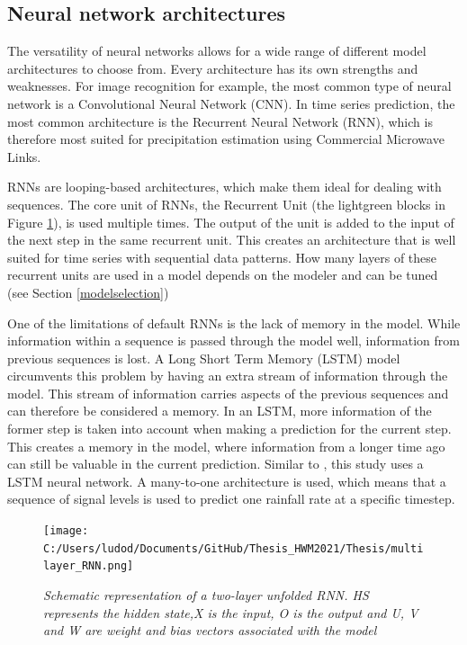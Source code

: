 \documentclass[twocolumn, 10pt, a4paper]{memoir}
\begin{document}
		\subsection{Neural network architectures} \label{NN architecture}
		The versatility of neural networks allows for a wide range of different model architectures to choose from. Every architecture has its own strengths and weaknesses. For image recognition for example, the most common type of neural network is a Convolutional Neural Network (CNN). In time series prediction, the most common architecture is the Recurrent Neural Network (RNN), which is therefore most suited for precipitation estimation using Commercial Microwave Links.
		
		RNNs are looping-based architectures, which make them ideal for dealing with sequences. The core unit of RNNs, the Recurrent Unit (the lightgreen blocks in Figure \ref{fig: multilayer RNN}), is used multiple times. The output of the unit is added to the input of the next step in the same recurrent unit. This creates an architecture that is well suited for time series with sequential data patterns. How many layers of these recurrent units are used in a model depends on the modeler and can be tuned (see Section \ref{modelselection})
		
		One of the limitations of default RNNs is the lack of memory in the model. While information within a sequence is passed through the model well, information from previous sequences is lost. A Long Short Term Memory (LSTM) model circumvents this problem by having an extra stream of information through the model. This stream of information carries aspects of the previous sequences and can therefore be considered a memory. In an LSTM, more information of the former step is taken into account when making a
		prediction for the current step. This creates a memory in the model, where information from a longer time ago can still be valuable in the current prediction. Similar to \cite{Habi2019}, this study uses a LSTM neural network. A many-to-one architecture is used, which means that a sequence of signal levels is used to predict one rainfall rate at a specific timestep. 
		
		\begin{figure} 
			\center
			\texttt{[image: C:/Users/ludod/Documents/GitHub/Thesis\_HWM2021/Thesis/multilayer\_RNN.png]}
			\caption{\textit{Schematic representation of a two-layer unfolded RNN. HS represents the hidden state,X is the input, O is the output and U, V and W are weight and bias vectors associated with the model}}
			\label{fig: multilayer RNN}
		\end{figure}
		
\end{document}
